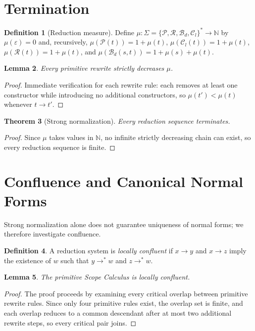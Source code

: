 \documentclass[11pt,twoside,openright]{book}
\numberwithin{equation}{chapter}
\theoremstyle{definition}
\newtheorem{definition}{Definition}[chapter]
\theoremstyle{plain}
\newtheorem{theorem}[definition]{Theorem}
\newtheorem{lemma}[definition]{Lemma}
\theoremstyle{remark}
\theoremstyle{definition}
\newcommand{\Alphabet}{\Sigma}
\newcommand{\Pop}{\mathcal{P}}
\newcommand{\Refuse}{\mathcal{R}}
\newcommand{\Bind}{\mathcal{B}_d}
\newcommand{\Collapse}{\mathcal{C}_l}
\newcommand{\ScopeAlphabet}{\Alphabet=\{\Pop,\Refuse,\Bind,\Collapse\}}
\begin{document}
\section{Termination}

\begin{definition}[Reduction measure]
Define $\mu:\ScopeAlphabet^{*}\to\mathbb{N}$ by $\mu(\varepsilon)=0$ and,
recursively, $\mu(\Pop(t))=1+\mu(t)$, $\mu(\Collapse(t))=1+\mu(t)$,
$\mu(\Refuse(t))=1+\mu(t)$, and $\mu(\Bind(s,t))=1+\mu(s)+\mu(t)$.
\end{definition}

\begin{lemma}
Every primitive rewrite strictly decreases $\mu$.
\end{lemma}

\begin{proof}
Immediate verification for each rewrite rule: each removes at least one
constructor while introducing no additional constructors, so
$\mu(t')<\mu(t)$ whenever $t\to t'$.
\end{proof}

\begin{theorem}[Strong normalization]
Every reduction sequence terminates.
\end{theorem}

\begin{proof}
Since $\mu$ takes values in $\mathbb{N}$, no infinite strictly decreasing
chain can exist, so every reduction sequence is finite.
\end{proof}

\section{Confluence and Canonical Normal Forms}

Strong normalization alone does not guarantee uniqueness of normal
forms; we therefore investigate confluence.

\begin{definition}
A reduction system is \emph{locally confluent} if $x\to y$ and $x\to z$
imply the existence of $w$ such that $y\to^{*}w$ and $z\to^{*}w$.
\end{definition}

\begin{lemma}
The primitive Scope Calculus is locally confluent.
\end{lemma}

\begin{proof}
The proof proceeds by examining every critical overlap between primitive
rewrite rules. Since only four primitive rules exist, the overlap set is
finite, and each overlap reduces to a common descendant after at most two
additional rewrite steps, so every critical pair joins.
\end{proof}
\end{document}
